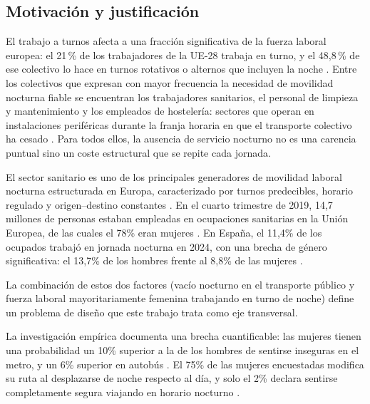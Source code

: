 
\subsection{Motivación y justificación}
\label{sec:motivacion}

\begin{claimS}
El trabajo a turnos afecta a una fracción significativa de la fuerza
laboral europea: el 21\,\% de los trabajadores de la UE-28 trabaja en
turno, y el 48,8\,\% de ese colectivo lo hace en turnos rotativos o
alternos que incluyen la noche \cite{SanchezSellero2025}. Entre los
colectivos que expresan con mayor frecuencia la necesidad de movilidad
nocturna fiable se encuentran los trabajadores sanitarios, el personal
de limpieza y mantenimiento y los empleados de hostelería: sectores que
operan en instalaciones periféricas durante la franja horaria en que el
transporte colectivo ha cesado \cite{URBACT2025Gender}. Para todos
ellos, la ausencia de servicio nocturno no es una carencia puntual sino
un coste estructural que se repite cada jornada.
\end{claimS}

\begin{claimS}
El sector sanitario es uno de los principales generadores de movilidad
laboral nocturna estructurada en Europa, caracterizado por turnos
predecibles, horario regulado y origen--destino constantes
\parencite{Eurofound2020Sectors}. En el cuarto trimestre de 2019, 14,7 millones de personas
estaban empleadas en ocupaciones sanitarias en la Unión Europea, de las cuales
el 78\% eran mujeres \parencite{Eurostat2020Health}. En España, el
11,4\% de los ocupados trabajó en jornada nocturna en 2024, con una brecha de
género significativa: el 13,7\% de los hombres frente al 8,8\% de las
mujeres \parencite{INE2025EPA}.
\end{claimS}

La combinación de estos dos factores (vacío nocturno en el transporte
público y fuerza laboral mayoritariamente femenina trabajando en turno de
noche) define un problema de diseño que este
trabajo trata como eje transversal. 

\begin{claimS}
La investigación empírica documenta una brecha cuantificable: las mujeres
tienen una probabilidad un 10\% superior a la de los hombres de sentirse
inseguras en el metro, y un 6\% superior en autobús
\parencite{AitBihiOuali2020}. El 75\% de las mujeres encuestadas modifica
su ruta al desplazarse de noche respecto al día, y solo el 2\% declara
sentirse completamente segura viajando en horario nocturno
\parencite{URBACT2025Gender}.
\end{claimS}

